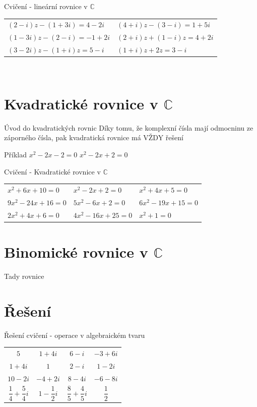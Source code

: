 \documentclass[aspectratio=169]{beamer} %
\newcommand{\C}{$\mathbb{C}$}
\newcommand{\reseni}[1]{\ \hfill \hyperlink{#1}{\beamergotobutton{\Large Řešení}}}
\newcommand{\zpet}[1]{\hyperlink{#1}{\beamerreturnbutton{\Large Zpět}} \hfill }
\begin{document}
	\begin{frame}[label=C6]{Cvičení - lineární rovnice v \C}
	 \begin{tabular}{C{6cm} C{6cm}}
	 $(2 - i)z - (1 + 3i) = 4 - 2i$ & $(4 + i)z - (3 - i) = 1 + 5i$ \\[3ex]
	 $(1 - 3i)z - (2 - i) = -1 + 2i$ & $(2 + i)z + (1 - i)z = 4 + 2i$ \\[3ex]
	 $(3 - 2i)z - (1 + i)z = 5 - i$ & $(1 + i)z + 2z = 3 - i$ \\[3ex]
	 \end{tabular} 
	 \reseni{Ř6}
	\end{frame}
	
\section{Kvadratické rovnice v $\mathbb{C}$}

	\begin{frame}{Úvod do kvadratických rovnic}
	Díky tomu, že komplexní čísla mají odmocninu ze záporného čísla, pak kvadratická rovnice má VŽDY řešení 
	\end{frame} 
	
	\begin{frame}{Příklad}
	$x^2-2x-2=0$ $x^2-2x+2=0$
	\end{frame}
	
	\begin{frame}[label=C7]{Cvičení - Kvadratické rovnice v \C}
	\begin{tabular}{C{4cm} C{4cm} C{4cm}}
	 $x^2+6x+10=0$ & $x^2-2x+2 = 0$ & $x^2+4x+5=0$\\[3ex]
	 $9x^2-24x+16=0$ & $5x^2-6x+2 = 0$ & $6x^2-19x+15=0$\\[3ex]
	 $2x^2+4x+6=0$ & $4x^2-16x+25 = 0$ & $x^2+1=0$\\[3ex]
	 \end{tabular}
	\end{frame}
	
\section{Binomické rovnice v $\mathbb{C}$}
	\begin{frame}
	Tady rovnice
	\end{frame} 

\section{Řešení}
	\begin{frame}[label=Ř1]{Řešení cvičení - operace v algebraickém tvaru}
	\begin{tabular}{cccc}
	$5$ & $1+4i$ & $6-i$ & $-3+6i$ \\
	$1+4i$ & $1$ & $2-i$ & $1-2i$ \\
	$10-2i$ & $-4+2i$ & $8-4i$ & $-6-8i$ \\
	$\dfrac{1}{4}+\dfrac{5}{4}i$ & $1-\dfrac{1}{2}i$ & $\dfrac{8}{5}+\dfrac{4}{5}i$ & $\dfrac{1}{2}$ \\[2ex]
	\end{tabular} \\
	\zpet{C1}
	
	\end{frame}
	
\end{document}
